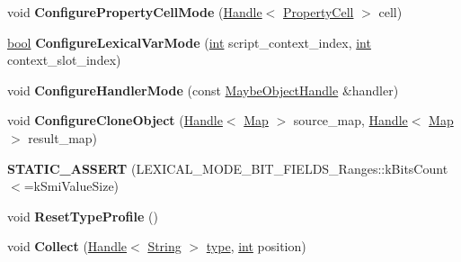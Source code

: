 \begin{DoxyCompactItemize}
\item 
\mbox{\label{classv8_1_1internal_1_1FeedbackNexus_a12ec5f9e463cadd1d784a1129e290c53}} 
void {\bfseries Configure\+Property\+Cell\+Mode} (\mbox{\hyperlink{classv8_1_1internal_1_1Handle}{Handle}}$<$ \mbox{\hyperlink{classv8_1_1internal_1_1PropertyCell}{Property\+Cell}} $>$ cell)
\item 
\mbox{\label{classv8_1_1internal_1_1FeedbackNexus_ad3892cf93a5983ed04fe69c315c8033d}} 
\mbox{\hyperlink{classbool}{bool}} {\bfseries Configure\+Lexical\+Var\+Mode} (\mbox{\hyperlink{classint}{int}} script\+\_\+context\+\_\+index, \mbox{\hyperlink{classint}{int}} context\+\_\+slot\+\_\+index)
\item 
\mbox{\label{classv8_1_1internal_1_1FeedbackNexus_a4c90b0f5062649ac14a05dd1a49446e5}} 
void {\bfseries Configure\+Handler\+Mode} (const \mbox{\hyperlink{classv8_1_1internal_1_1MaybeObjectHandle}{Maybe\+Object\+Handle}} \&handler)
\item 
\mbox{\label{classv8_1_1internal_1_1FeedbackNexus_a3ef4c29e93e677356ee6ad1512093a11}} 
void {\bfseries Configure\+Clone\+Object} (\mbox{\hyperlink{classv8_1_1internal_1_1Handle}{Handle}}$<$ \mbox{\hyperlink{classv8_1_1internal_1_1Map}{Map}} $>$ source\+\_\+map, \mbox{\hyperlink{classv8_1_1internal_1_1Handle}{Handle}}$<$ \mbox{\hyperlink{classv8_1_1internal_1_1Map}{Map}} $>$ result\+\_\+map)
\item 
\mbox{\label{classv8_1_1internal_1_1FeedbackNexus_a2d1215e4f13e68e7ca38f82bb2d466c6}} 
{\bfseries S\+T\+A\+T\+I\+C\+\_\+\+A\+S\+S\+E\+RT} (L\+E\+X\+I\+C\+A\+L\+\_\+\+M\+O\+D\+E\+\_\+\+B\+I\+T\+\_\+\+F\+I\+E\+L\+D\+S\+\_\+\+Ranges\+::k\+Bits\+Count$<$=k\+Smi\+Value\+Size)
\item 
\mbox{\label{classv8_1_1internal_1_1FeedbackNexus_a61d276540452b69fe5e8e8642e867f58}} 
void {\bfseries Reset\+Type\+Profile} ()
\item 
\mbox{\label{classv8_1_1internal_1_1FeedbackNexus_acc4eaba00ac8fa405374a05fd2f8e1d6}} 
void {\bfseries Collect} (\mbox{\hyperlink{classv8_1_1internal_1_1Handle}{Handle}}$<$ \mbox{\hyperlink{classv8_1_1internal_1_1String}{String}} $>$ \mbox{\hyperlink{classstd_1_1conditional_1_1type}{type}}, \mbox{\hyperlink{classint}{int}} position)

\end{DoxyCompactItemize}
